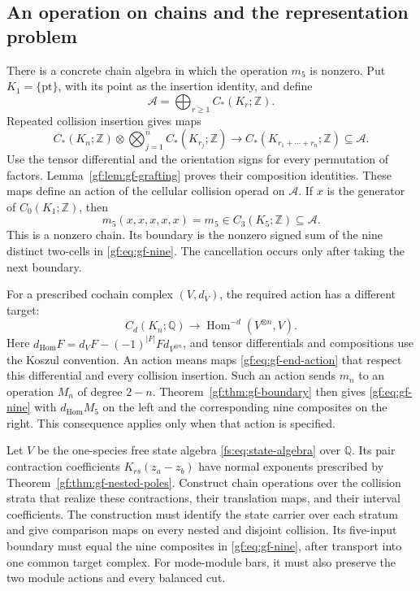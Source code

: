 \subsection{An operation on chains and the representation problem}
\label{gf:sec:gf-action}

There is a concrete chain algebra in which the operation
\(m_5\) is nonzero.  Put \(K_1=\{\mathrm{pt}\}\), with its
point as the insertion identity, and define
\[
 \mathcal A=\bigoplus_{r\geq1}C_*(K_r;\mathbb Z).
\]
Repeated collision insertion gives maps
\[
 C_*(K_n;\mathbb Z)\otimes
 \bigotimes_{j=1}^nC_*(K_{r_j};\mathbb Z)
 \longrightarrow C_*(K_{r_1+\cdots+r_n};\mathbb Z)
 \subseteq\mathcal A.
\]
Use the tensor differential and the orientation signs for every
permutation of factors.  Lemma~\ref{gf:lem:gf-grafting} proves their
composition identities.  These maps define an action of the
cellular collision operad on \(\mathcal A\).
If \(x\) is the generator of \(C_0(K_1;\mathbb Z)\), then
\[
 m_5(x,x,x,x,x)=m_5\in C_3(K_5;\mathbb Z)\subseteq\mathcal A.
\]
This is a nonzero chain.  Its boundary is the nonzero signed sum
of the nine distinct two-cells in \eqref{gf:eq:gf-nine}.
The cancellation occurs only after taking the next boundary.

For a prescribed cochain complex \((V,d_V)\), the required action
has a different target:
\begin{equation}\label{gf:eq:gf-end-action}
 C_d(K_n;\mathbb Q)\longrightarrow
 \operatorname{Hom}^{-d}(V^{\otimes n},V).
\end{equation}
Here
\(d_{\mathrm{Hom}}F=d_VF-(-1)^{|F|}F d_{V^{\otimes n}}\),
and tensor differentials and compositions use the Koszul convention.
An action means maps \eqref{gf:eq:gf-end-action} that respect this
differential and every collision insertion.
Such an action sends \(m_n\) to an operation \(M_n\) of
degree \(2-n\).  Theorem~\ref{gf:thm:gf-boundary} then gives
\eqref{gf:eq:gf-nine} with \(d_{\mathrm{Hom}}M_5\) on the left
and the corresponding nine composites on the right.
This consequence applies only when that action is specified.

\begin{problem}
\label{gf:prob:gf-native-action}
Let \(V\) be the one-species free state algebra
\eqref{fs:eq:state-algebra} over \(\mathbb Q\).
Its pair contraction coefficients \(K_{rs}(z_a-z_b)\)
have normal exponents prescribed by
Theorem~\ref{gf:thm:gf-nested-poles}.  Construct chain operations
over the collision strata that realize these contractions, their
translation maps, and their interval coefficients.
The construction must identify the state carrier over each stratum
and give comparison maps on every nested and disjoint collision.
Its five-input boundary must equal the nine composites in
\eqref{gf:eq:gf-nine}, after transport into one common target complex.
For mode-module bars, it must also preserve the two module actions
and every balanced cut.
\end{problem}

